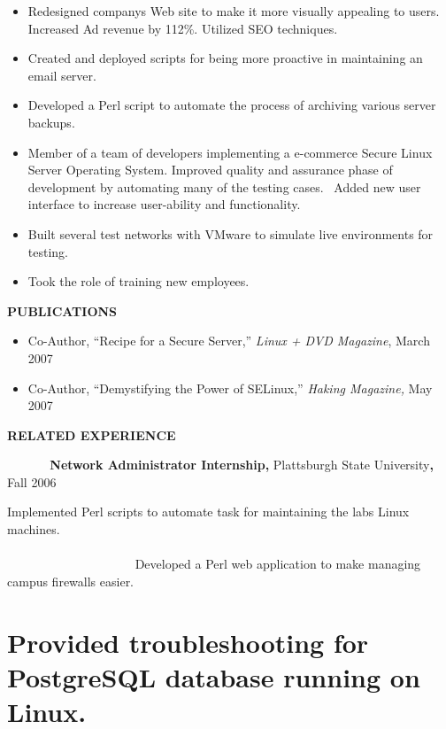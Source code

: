 \documentclass{article}
\newcommand\liststyleWWviiiNumii{%
\renewcommand\labelitemi{[F0B7?]}
\renewcommand\labelitemii{[F081?]}
\renewcommand\labelitemiii{${\blacksquare}$}
\renewcommand\labelitemiv{[F06C?]}
}
\newcommand\liststyleWWviiiNumiii{%
\renewcommand\labelitemi{[F0B7?]}
\renewcommand\labelitemii{[F081?]}
\renewcommand\labelitemiii{${\blacksquare}$}
\renewcommand\labelitemiv{[F06C?]}
}
\begin{document}
\liststyleWWviiiNumii
\begin{itemize}
\item {\sffamily
Redesigned company{\textquotesingle}s Web site to make it more visually
appealing to users. Increased Ad revenue by 112\%. Utilized SEO
techniques.}
\item {\sffamily
Created and deployed scripts for being more proactive in maintaining an
email server.}
\item {\sffamily
Developed a Perl script to automate the process of archiving various
server backups. \ \ \ \   \ \ \ \ \ \ \ \ \ \ }
\item {\sffamily
Member of a team of developers implementing a e-commerce Secure Linux
Server Operating System. Improved quality and assurance phase of
development by automating many of the testing cases. \ Added new user
interface to increase user-ability and functionality.}
\item {\sffamily
Built several test networks with VMware to simulate live environments
for testing.}
\item {\sffamily
Took the role of training new employees.}
\end{itemize}

\bigskip

{\sffamily\bfseries
PUBLICATIONS}


\bigskip

\liststyleWWviiiNumiii
\begin{itemize}
\item {\sffamily
Co-Author, {\textquotedblleft}Recipe for a Secure
Server,{\textquotedblright} \textit{Linux + DVD Magazine}, March 2007}
\item {\sffamily
Co-Author, {\textquotedblleft}Demystifying the Power of
SELinux,{\textquotedblright} \textit{Haking Magazine,} May 2007}
\end{itemize}

\bigskip

{\sffamily\bfseries
RELATED EXPERIENCE}


\bigskip

{\sffamily
\textbf{\ \ \ \ \ \ Network Administrator Internship,} Plattsburgh State
University\textbf{, }Fall 2006}

{\sffamily
Implemented Perl scripts to automate task for maintaining the
lab{\textquotesingle}s Linux machines.
\ \ \ \ \ \ \ \ \ \ \ \ \ \ \ \ \ \ \ \ \ \ \ \ \ \ \ \ \ \ \ \ \ \ \ \ \ \ \ \ \ \ \ \ \ \ \ \ \ \ \ \ \ \ \ \ \ \ \ \ \ \ \ \ \ \ \ \ \ \ \ \ \ \ \ \ \ \ \ \ \ \ \ \ \ \ \ \ \ \ \ \ }
{\sffamily
Developed a Perl web application to make managing campus firewalls
easier. \ }
\section[Provided troubleshooting for PostgreSQL database running on
Linux.
\ \ \ \ \ \ \ \ \ \ \ \ \ \ \ \ \ \ \ \ \ \ \ \ \ ]{\textmd{Provided
troubleshooting for PostgreSQL database running on Linux.}
\ \ \ \ \ \ \ \ \ \ \ \ \ \ \ \ \ \ \ \ \ \ \ \ \ }

\bigskip
\end{document}
